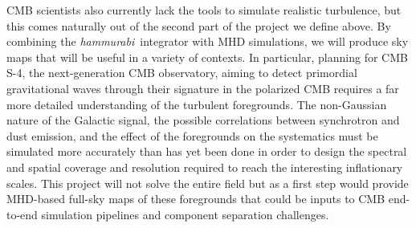 \documentclass[12pt]{article}
\newcommand{\hammurabi}{\textsl{hammurabi}}
\begin{document}
CMB scientists also currently lack the tools to simulate realistic turbulence, but this comes naturally out of the second part of the project we define above. By combining the \hammurabi\ integrator with MHD simulations, we will produce sky maps that will be useful in a variety of contexts. In particular, planning for CMB S-4, the next-generation CMB observatory, aiming to detect primordial gravitational waves through their signature in the polarized CMB requires a far more detailed understanding of the turbulent foregrounds. The non-Gaussian nature of the Galactic signal, the possible correlations between synchrotron and dust emission, and the effect of the foregrounds on the systematics must be simulated more accurately than has yet been done in order to design the spectral and spatial coverage and resolution required to reach the interesting inflationary scales. This project will not solve the entire field but as a first step would provide MHD-based full-sky maps of these foregrounds that could be inputs to CMB end-to-end simulation pipelines and component separation challenges. 


\newpage


\end{document}
